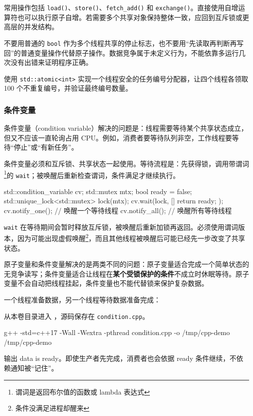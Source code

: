 常用操作包括 \texttt{load()}、\texttt{store()}、\texttt{fetch\_add()} 和 \texttt{exchange()}。直接使用自增运算符也可以执行原子自增。若需要多个共享对象保持整体一致，应回到互斥锁或更高层的并发结构。

\begin{note}
不要用普通的 \texttt{bool} 作为多个线程共享的停止标志，也不要用“先读取再判断再写回”的普通变量操作代替原子操作。数据竞争属于未定义行为，不能依靠多运行几次没有出错来证明程序正确。
\end{note}

\begin{exercise}\label{ex:v1-cpp-atomic}

使用 \texttt{std::atomic<int>} 实现一个线程安全的任务编号分配器，让四个线程各领取 100 个不重复编号，并验证最终编号数量。
\end{exercise}

\subsubsection{条件变量}
条件变量（condition variable）解决的问题是：线程需要等待某个共享状态成立，但又不应该一直轮询占用 CPU。例如，消费者要等待队列非空，工作线程要等待“停止”或“有新任务”。

条件变量必须和互斥锁、共享状态一起使用。等待流程是：先获得锁，调用带谓词\footnote{谓词是返回布尔值的函数或 lambda 表达式}的 \texttt{wait}；被唤醒后重新检查谓词，条件满足才继续执行。

\begin{tcode}
std::condition_variable cv;
std::mutex mtx;
bool ready = false;
{
    std::unique_lock<std::mutex> lock(mtx);
    cv.wait(lock, [] { return ready; });
}
cv.notify_one();       // 唤醒一个等待线程
cv.notify_all();       // 唤醒所有等待线程
\end{tcode}

\texttt{wait} 在等待期间会暂时释放互斥锁，被唤醒后重新加锁再返回。必须使用谓词版本，因为可能出现虚假唤醒\footnote{条件没满足进程却醒来}，而且其他线程被唤醒后可能已经先一步改变了共享状态。

\begin{conclusion}
原子变量和条件变量解决的是两类不同的问题：原子变量适合完成一个简单状态的无竞争读写；条件变量适合让线程在\textbf{某个受锁保护的条件}不成立时休眠等待。原子变量不会自动把线程挂起，条件变量也不能代替锁来保护复杂数据。
\end{conclusion}

\begin{example}
一个线程准备数据，另一个线程等待数据准备完成：



从本卷目录进入 ，源码保存在 \texttt{condition.cpp}。
\begin{tbash}
g++ -std=c++17 -Wall -Wextra -pthread condition.cpp -o /tmp/cpp-demo
/tmp/cpp-demo
\end{tbash}
输出 data is ready。即使生产者先完成，消费者也会依据 ready 条件继续，不依赖通知被“记住”。
\end{example}

